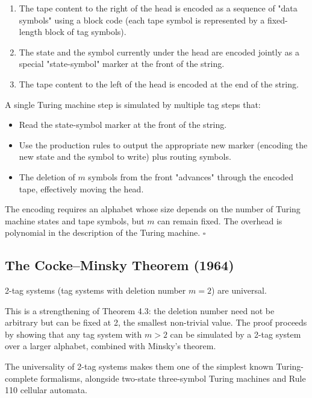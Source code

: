 \begin{enumerate}
  \item The tape content to the right of the head is encoded as a sequence of "data symbols" using a block code (each tape symbol is represented by a fixed-length block of tag symbols).
  \item The state and the symbol currently under the head are encoded jointly as a special "state-symbol" marker at the front of the string.
  \item The tape content to the left of the head is encoded at the end of the string.
\end{enumerate}

A single Turing machine step is simulated by multiple tag steps that:
\begin{itemize}
  \item Read the state-symbol marker at the front of the string.
  \item Use the production rules to output the appropriate new marker (encoding the new state and the symbol to write) plus routing symbols.
  \item The deletion of $m$ symbols from the front "advances" through the encoded tape, effectively moving the head.
\end{itemize}

The encoding requires an alphabet whose size depends on the number of Turing machine states and tape symbols, but $m$ can remain fixed. The overhead is polynomial in the description of the Turing machine. $\square$

\subsection{The Cocke--Minsky Theorem (1964)}

\begin{theorem}
2-tag systems (tag systems with deletion number $m = 2$) are universal.

This is a strengthening of Theorem 4.3: the deletion number need not be arbitrary but can be fixed at 2, the smallest non-trivial value. The proof proceeds by showing that any tag system with $m > 2$ can be simulated by a 2-tag system over a larger alphabet, combined with Minsky's theorem.

The universality of 2-tag systems makes them one of the simplest known Turing-complete formalisms, alongside two-state three-symbol Turing machines and Rule 110 cellular automata.
\end{theorem}

